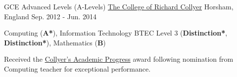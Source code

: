 \begin{cventries}
  \cventry
    {GCE Advanced Levels (A-Levels)}
    {\href{https://www.collyers.ac.uk/}{The College of Richard Collyer}}
    {Horsham, England}
    {Sep. 2012 - Jun. 2014}
    {
      \begin{cvitems}
        \item {Computing (\textbf{A*}), Information Technology BTEC Level 3 (\textbf{Distinction*}, \textbf{Distinction*}), Mathematics (\textbf{B})}
        \item {Received the \href{https://www.westsussextoday.co.uk/news/outstanding-students-recognised-at-collyer-s-1-6481659}{Collyer's Academic Progress} award following nomination from Computing teacher for exceptional performance.}
      \end{cvitems}
    }
    {}
\end{cventries}
